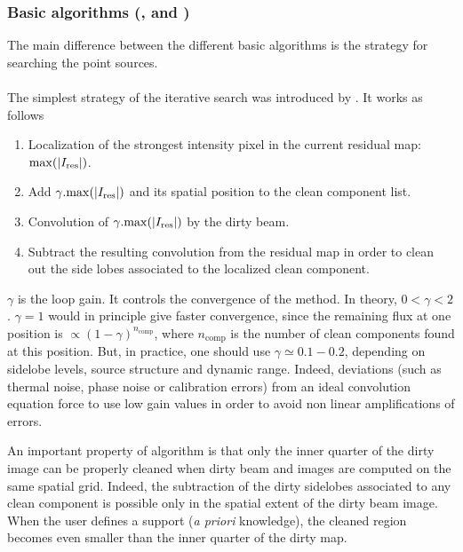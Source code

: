 \subsubsection{Basic \clean{} algorithms (,  and )}

The main difference between the different basic \clean{} algorithms is 
the strategy for searching the point sources.

\paragraph{}

The simplest strategy of the iterative search was introduced by
\cite{hogbom74}. It works as follows
\begin{enumerate}
\item Localization of the strongest intensity pixel in the current residual
  map: $\mathrm{max}(\left| I_{\mathrm{res}} \right|)$.
\item Add $\gamma.\mathrm{max}(\left| I_{\mathrm{res}} \right|)$ and its spatial position to
  the clean component list.
\item Convolution of $\gamma.\mathrm{max}(\left| I_{\mathrm{res}} \right|)$ by the dirty
  beam.
\item Subtract the resulting convolution from the residual map in order to
  clean out the side lobes associated to the localized clean component.
\end{enumerate}
$\gamma$ is the loop gain. It controls the convergence of the method. In
theory, $ 0 < \gamma < 2$. $ \gamma =1$ would in principle give
faster convergence, since the remaining flux at one position is $ \propto
(1-\gamma)^{n_{{\mathrm{comp}}}}$, where $n_{\mathrm{comp}}$ is the number of
clean components found at this position. But, in practice, one should use $
\gamma \simeq 0.1 - 0.2$, depending on sidelobe levels, source structure
and dynamic range.  Indeed, deviations (such as thermal noise, phase noise
or calibration errors) from an ideal convolution equation force to use low
gain values in order to avoid non linear amplifications of errors.

An important property of  algorithm is that only the inner
quarter of the dirty image can be properly cleaned when dirty beam and
images are computed on the same spatial grid. Indeed, the subtraction of
the dirty sidelobes associated to any clean component is possible only in
the spatial extent of the dirty beam image. When the user defines a support
(\emph{a priori} knowledge), the cleaned region becomes even smaller than
the inner quarter of the dirty map.


